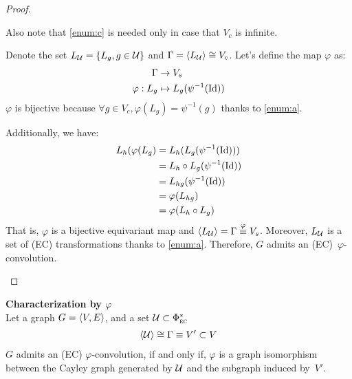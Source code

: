 \begin{proof}
\begin{enumerate}
Also note that \ref{enum:c} is needed only in case that $V_c$ is infinite.

Denote the set $L_{\mathcal{U}} = \{L_g, g \in \mathcal{U} \}$ and $\Gamma = \langle L_{\mathcal{U}} \rangle \cong V_c$. Let's define the map $\varphi$ as:
\begin{align*}
\Gamma & \rightarrow V_s\\
\varphi: L_g & \mapsto L_g(\psi^{-1}(\operatorname{Id}))
\end{align*}
$\varphi$ is bijective because $\forall g \in V_c, \varphi(L_g) = \psi^{-1}(g)$ thanks to \ref{enum:a}.

Additionally, we have:
\begin{align*}
L_h(\varphi(L_g) & = L_h(L_g(\psi^{-1}(\operatorname{Id})))\\
 & = L_h \circ L_g(\psi^{-1}(\operatorname{Id}))\\
 & = L_{hg}(\psi^{-1}(\operatorname{Id}))\\
 & = \varphi(L_{hg})\\
 & = \varphi(L_h \circ L_g)
\end{align*}
That is, $\varphi$ is a bijective equivariant map and $ \langle L_{\mathcal{U}} \rangle = \Gamma \overset{\varphi}{\equiv} V_s$. Moreover, $L_{\mathcal{U}}$ is a set of (EC) transformations thanks to \ref{enum:a}. Therefore, $G$ admits an (EC)~$\varphi$-convolution.
\end{enumerate}
\end{proof}

\begin{corrolary}\textbf{Characterization by $\varphi$}\\
Let a graph $G = \langle V, E \rangle$, and a set $\mathcal{U} \subset \Phi^*_{\operatorname{\textsc{ec}}}$ \st
\begin{gather*}
\langle \mathcal{U} \rangle \cong \Gamma \equiv V' \subset V
\end{gather*}
$G$ admits an (EC) $\varphi$-convolution, if and only if, $\varphi$ is a graph isomorphism between the Cayley graph generated by $\mathcal{U}$ and the subgraph induced by~$V'$.
\label{cor:cayley}
\end{corrolary}




